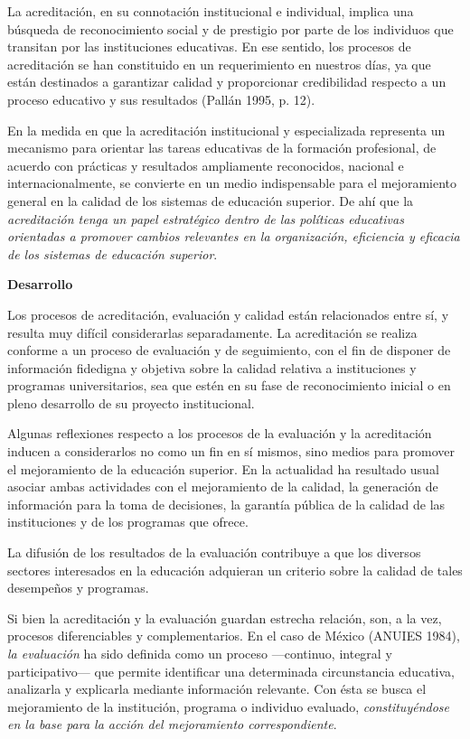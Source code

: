 \begin{sloppypar} 
La acreditación, en su connotación institucional e individual, implica una búsqueda de
reconocimiento social y de prestigio por parte de los individuos que
transitan por las instituciones educativas. En ese sentido, los procesos de
acreditación se han constituido en un requerimiento en nuestros días, ya
que están destinados a garantizar calidad y proporcionar credibilidad
respecto a un proceso educativo y sus resultados (Pallán 1995, p. 12).
\end{sloppypar}

En la medida en que la
acreditación institucional y especializada representa un mecanismo para
orientar las tareas educativas de la formación profesional, de acuerdo con
prácticas y resultados ampliamente reconocidos, nacional e
internacionalmente, se convierte en un medio indispensable para el
mejoramiento general en la calidad de los sistemas de educación superior.
De ahí que la \textit{acreditación
tenga un papel estratégico dentro de las políticas
educativas orientadas a promover cambios relevantes en la organización, eficiencia y
eficacia de los sistemas de educación
superior}.
\newpage

\textbf{Desarrollo}

Los procesos de
acreditación, evaluación y calidad están relacionados entre sí, y resulta
muy difícil considerarlas separadamente. La acreditación se realiza
conforme a un proceso de evaluación y de seguimiento, con el fin de
disponer de información fidedigna y objetiva sobre la calidad relativa a
instituciones y programas universitarios, sea que estén en su fase de
reconocimiento inicial o en pleno desarrollo de su proyecto
institucional.

\enlargethispage{1\baselineskip}
Algunas reflexiones
respecto a los procesos de la evaluación y la acreditación inducen a
considerarlos no como un fin en sí mismos, sino medios para promover el
mejoramiento de la educación superior. En la actualidad ha resultado usual
asociar ambas actividades con el mejoramiento de la calidad, la generación
de información para la toma de decisiones, la garantía pública de la
calidad de las instituciones y de los programas que ofrece.

La difusión de los
resultados de la evaluación contribuye a que los diversos sectores
interesados en la educación adquieran un criterio sobre la calidad de tales
desempeños y programas.

 
 Si bien la acreditación y
la evaluación guardan estrecha relación, son, a la vez, procesos
diferenciables y complementarios. En el caso de México (ANUIES 1984),
\textit{la
evaluación}  ha sido
definida como un proceso ---continuo, integral y participativo--- que permite
identificar una determinada circunstancia educativa, analizarla y
explicarla mediante información relevante. Con ésta se busca el
mejoramiento de la institución, programa o individuo evaluado,
 \textit{constituyéndose en la base para la acción del mejoramiento
correspondiente}.

